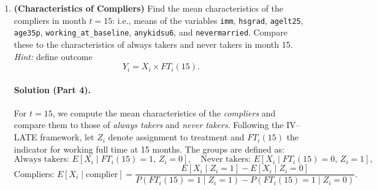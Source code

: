 \documentclass[12pt]{article}
\begin{document}
\begin{enumerate}[label=\arabic*.]
    \noindent\textbf{Verification.} For each \(t\), we verified in the notebook that
    \[
    \widehat{\beta}_1 \;=\; \frac{\widehat{\delta}_1}{\widehat{\pi}_1},
    \]
    i.e., the 2SLS slope equals the ratio of the reduced-form coefficient on
    \(\text{treatment}\) in the welfare equation (\(\widehat{\delta}_1\)) to the
    first-stage coefficient of \(\text{treatment}\) in the \(FT\) equation
    (\(\widehat{\pi}_1\)); the numerical equality holds up to rounding.

    \medskip
    \noindent\textbf{Interpretation.}
    The estimates imply a large negative LATE of full-time work on welfare receipt
    for compliers:
    at \(t=15\)–\(24\) months, \(\widehat{\beta}_1\approx -1\) and highly significant,
    suggesting that moving from not working FT to working FT (for those whose FT
    status is shifted by the SSP offer) nearly eliminates welfare participation at
    those horizons. By \(t=48\), the effect attenuates to about \(-0.83\) and remains
    statistically significant at conventional levels. This time pattern mirrors the
    program’s temporary subsidy window and the weakening first stage at \(t=48\).
    (Note: with a linear probability model, sampling noise can push \(\widehat{\beta}_1\)
    slightly outside \([-1,1]\); the substantive conclusion is unchanged.)


    \item \textbf{(Characteristics of Compliers)} 
        Find the mean characteristics of the compliers in month $t = 15$: i.e., means of the variables 
        \texttt{imm}, \texttt{hsgrad}, \texttt{agelt25}, \texttt{age35p}, 
        \texttt{working\_at\_baseline}, \texttt{anykidsu6}, and \texttt{nevermarried}. 
        Compare these to the characteristics of always takers and never takers in month 15. 
        \emph{Hint:} define outcome 
        \[
        Y_i = X_i \times FT_i(15).
        \]

    \paragraph{Solution (Part 4).}
    For \(t = 15\), we compute the mean characteristics of the \emph{compliers} and compare them to those of \emph{always takers} and \emph{never takers}. Following the IV--LATE framework, let \(Z_i\) denote assignment to treatment and \(FT_i(15)\) the indicator for working full time at 15 months. The groups are defined as:
    \[
    \text{Always takers: } E[X_i \mid FT_i(15) = 1,\, Z_i = 0],
    \quad
    \text{Never takers: } E[X_i \mid FT_i(15) = 0,\, Z_i = 1],
    \]
    \[
    \text{Compliers: }
    E[X_i \mid \text{complier}] 
    = 
    \frac{E[X_i \mid Z_i=1] - E[X_i \mid Z_i=0]}
    {P(FT_i(15)=1 \mid Z_i=1) - P(FT_i(15)=1 \mid Z_i=0)}.
    \]


\end{enumerate}
\end{document}
